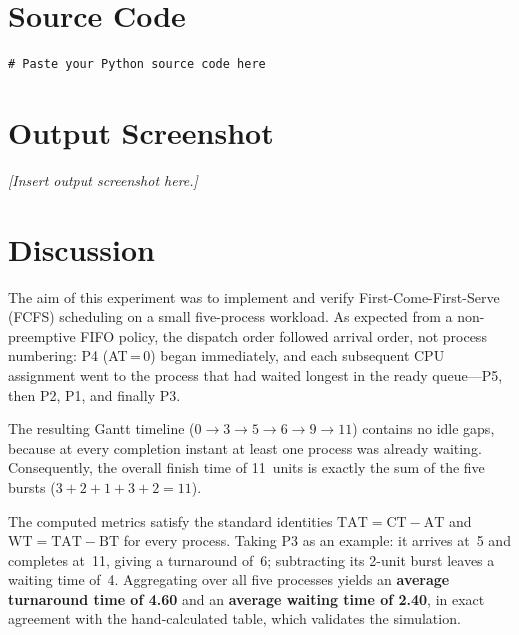 \documentclass[12pt,a4paper]{article}
\begin{document}
\section{Source Code}

\begin{lstlisting}[caption={FCFS Scheduling -- Python Implementation}]
# Paste your Python source code here
\end{lstlisting}

\section{Output Screenshot}


\textit{[Insert output screenshot here.]}

\section{Discussion}

The aim of this experiment was to implement and verify First-Come-First-Serve
(FCFS) scheduling on a small five-process workload. As expected from a
non-preemptive FIFO policy, the dispatch order followed arrival order, not
process numbering: P4 (AT\,=\,0) began immediately, and each subsequent CPU
assignment went to the process that had waited longest in the ready queue---P5,
then P2, P1, and finally P3.

The resulting Gantt timeline ($0 \to 3 \to 5 \to 6 \to 9 \to 11$) contains no
idle gaps, because at every completion instant at least one process was already
waiting. Consequently, the overall finish time of 11~units is exactly the sum
of the five bursts ($3+2+1+3+2=11$).

The computed metrics satisfy the standard identities
$\text{TAT} = \text{CT} - \text{AT}$ and $\text{WT} = \text{TAT} - \text{BT}$
for every process. Taking P3 as an example: it arrives at~5 and completes
at~11, giving a turnaround of~6; subtracting its 2-unit burst leaves a waiting
time of~4. Aggregating over all five processes yields an \textbf{average
turnaround time of 4.60} and an \textbf{average waiting time of 2.40}, in
exact agreement with the hand-calculated table, which validates the simulation.
\end{document}
